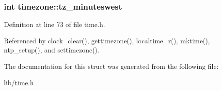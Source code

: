 \subsubsection[{\texorpdfstring{tz\+\_\+minuteswest}{tz_minuteswest}}]{\setlength{\rightskip}{0pt plus 5cm}int timezone\+::tz\+\_\+minuteswest}\hypertarget{structtimezone_a3042f7eff6e1b980728def76b1fa0eb7}{}\label{structtimezone_a3042f7eff6e1b980728def76b1fa0eb7}


Definition at line 73 of file time.\+h.



Referenced by clock\+\_\+clear(), gettimezone(), localtime\+\_\+r(), mktime(), ntp\+\_\+setup(), and settimezone().



The documentation for this struct was generated from the following file\+:\begin{DoxyCompactItemize}
\item 
lib/\hyperlink{time_8h}{time.\+h}\end{DoxyCompactItemize}

